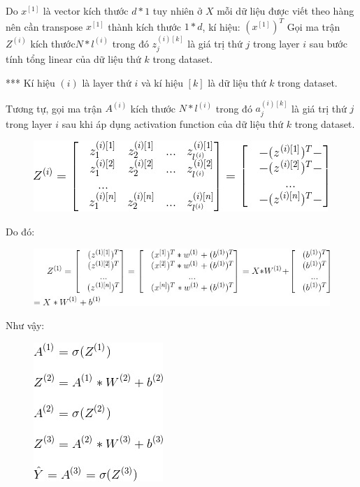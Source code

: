 Do $x^{[1]}$ là vector kích thước $d*1$ tuy nhiên ở $X$ mỗi dữ liệu được viết theo hàng nên cần transpose $x^{[1]}$ thành kích thước $1*d$, kí hiệu: $(x^{[1]})^T$
Gọi ma trận $Z^{(i)}$ kích thước$ N*l^{(i)}$ trong đó $z_{j}^{(i)[k]}$ là giá trị thứ $j$ trong layer $i$ sau bước tính tổng linear của dữ liệu thứ $k$ trong dataset.

*** Kí hiệu $(i)$ là layer thứ $i$ và kí hiệu $[k]$ là dữ liệu thứ $k$ trong dataset.

Tương tự, gọi ma trận $A^{(i)}$ kích thước $N*l^{(i)}$ trong đó $a_{j}^{(i)[k]}$ là giá trị thứ $j$ trong layer $i$ sau khi áp dụng activation function của dữ liệu thứ $k$ trong dataset.

\FloatBarrier
\begin{figure}[htp]
\begin{center}
\includegraphics[scale=0.8]{chap2/c2_figs/2.jpg}
\end{center}
\label{fig:feed_forward}
\end{figure}
\FloatBarrier

Do đó:

\FloatBarrier
\begin{figure}[htp]
\begin{center}
\includegraphics[scale=0.75]{chap2/c2_figs/3.jpg}
\end{center}
\label{fig:feed_forward}
\end{figure}
\FloatBarrier
Như vậy:

\FloatBarrier
\begin{figure}[htp]
\begin{center}
\includegraphics[scale=0.75]{chap2/c2_figs/4.jpg}
\end{center}
\label{fig:feed_forward}
\end{figure}
\FloatBarrier

